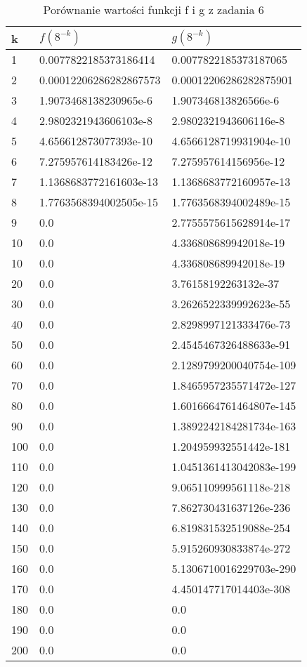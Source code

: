 \documentclass{article}
\begin{document}
\begin{table}[h!]
    \centering
    \begin{tabular}{|l|l|l|}
    \hline
    k  & \(f(8^{-k})\) & \(g(8^{-k})\) \\
    \hline
    1&0.0077822185373186414&0.0077822185373187065\\
    2&0.00012206286282867573&0.00012206286282875901\\
    3&1.9073468138230965e-6&1.907346813826566e-6\\
    4&2.9802321943606103e-8&2.9802321943606116e-8\\
    5&4.656612873077393e-10&4.6566128719931904e-10\\
    6&7.275957614183426e-12&7.275957614156956e-12\\
    7&1.1368683772161603e-13&1.1368683772160957e-13\\
    8&1.7763568394002505e-15&1.7763568394002489e-15\\
    9&0.0&2.7755575615628914e-17\\
    10&0.0&4.336808689942018e-19\\
    10&0.0&4.336808689942018e-19\\
    20&0.0&3.76158192263132e-37\\
    30&0.0&3.2626522339992623e-55\\
    40&0.0&2.8298997121333476e-73\\
    50&0.0&2.4545467326488633e-91\\
    60&0.0&2.1289799200040754e-109\\
    70&0.0&1.8465957235571472e-127\\
    80&0.0&1.6016664761464807e-145\\
    90&0.0&1.3892242184281734e-163\\
    100&0.0&1.204959932551442e-181\\
    110&0.0&1.0451361413042083e-199\\
    120&0.0&9.065110999561118e-218\\
    130&0.0&7.862730431637126e-236\\
    140&0.0&6.819831532519088e-254\\
    150&0.0&5.915260930833874e-272\\
    160&0.0&5.1306710016229703e-290\\
    170&0.0&4.450147717014403e-308\\
    180&0.0&0.0\\
    190&0.0&0.0\\
    200&0.0&0.0\\
     \hline
    \end{tabular}
    \caption{Porównanie wartości funkcji f i g z zadania 6}
    \label{table:11}
\end{table}
\end{document}
